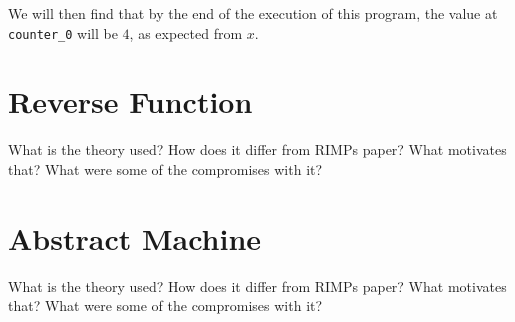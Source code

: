 We will then find that by the end of the execution of this program, the value at \lstinline{counter_0} will be $4$, as expected from $x$.

\section{Reverse Function}

What is the theory used?
How does it differ from RIMPs paper?
What motivates that?
What were some of the compromises with it?

\section{Abstract Machine}

What is the theory used?
How does it differ from RIMPs paper?
What motivates that?
What were some of the compromises with it?